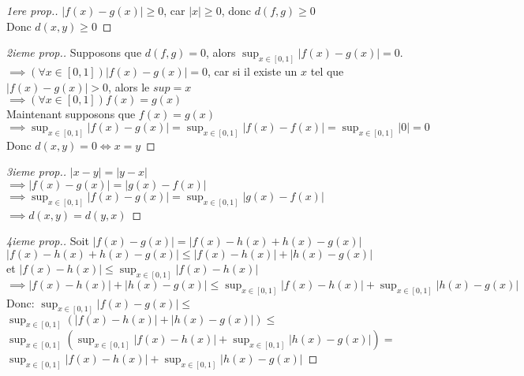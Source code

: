 \documentclass[12pt]{book}
\def\sep{\phantom{}}
\theoremstyle{definition}
\begin{document}
\begin{proof}[1ere prop.]
    $|f(x) - g(x)| \geq 0$, car $|x| \geq 0$, donc $d(f, g) \geq 0$ \sep \\
    Donc $d(x, y) \geq 0$
\end{proof}

\begin{proof}[2ieme prop.]
    Supposons que $d(f, g) = 0$, alors $\sup_{x \in [0, 1]} |f(x) - g(x)| = 0$. \sep \\
    $\implies (\forall x \in [0, 1]) |f(x) - g(x)| = 0$, car si il existe un $x$ tel que $|f(x) - g(x)| > 0$, alors le $sup = x$ \sep \\
    $\implies (\forall x \in [0, 1]) f(x) = g(x)$ \sep \\
    Maintenant supposons que $f(x) = g(x)$ \sep \\
    $\implies \sup_{x \in [0, 1]} |f(x) - g(x)| = \sup_{x \in [0, 1]} |f(x) - f(x)| = \sup_{x \in [0, 1]} |0| = 0$ \sep \\
    Donc $d(x, y) = 0 \iff x = y$
\end{proof} 

\begin{proof}[3ieme prop.]
    $|x - y| = |y - x|$ \sep \\
    $\implies |f(x) - g(x)| = |g(x) - f(x)|$ \sep \\
    $\implies \sup_{x \in [0, 1]} |f(x) - g(x)| = \sup_{x \in [0, 1]} |g(x) - f(x)|$ \sep \\
    $\implies d(x, y) = d(y, x)$ 
\end{proof}

\begin{proof}[4ieme prop.]
    Soit $|f(x) - g(x)| = |f(x) - h(x) + h(x) - g(x)|$ \sep \\
    $|f(x) - h(x) + h(x) - g(x)| \leq |f(x) - h(x)| + |h(x) - g(x)|$ \sep \\
    et $|f(x) - h(x)| \leq \sup_{x \in [0, 1]} |f(x) - h(x)|$ \sep \\
    $\implies |f(x) - h(x)| + |h(x) - g(x)| \leq \sup_{x \in [0, 1]} |f(x) - h(x)| + \sup_{x \in [0, 1]}|h(x) - g(x)| $ \sep \\
    Donc: $\sup_{x \in [0, 1]} |f(x) - g(x)| \leq$ \sep \\
    $\sup_{x \in [0, 1]} (|f(x) - h(x)| + |h(x) - g(x)|) \leq$ \sep \\
    $\sup_{x \in [0, 1]}(\sup_{x \in [0, 1]} |f(x) - h(x)| + \sup_{x \in [0, 1]}|h(x) - g(x)|) =$
    $\sup_{x \in [0, 1]} |f(x) - h(x)| + \sup_{x \in [0, 1]}|h(x) - g(x)|$
\end{proof}
\end{document}
